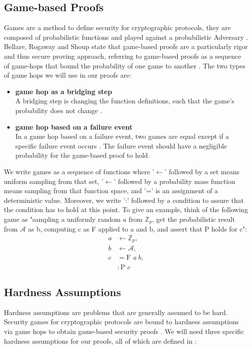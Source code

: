 \subsection{Game-based Proofs}
Games are a method to define security for cryptographic protocols, they are composed of probabilistic functions and played against a probabilistic Adversary \parencite{shoup_games}. Bellare, Rogaway and Shoup state that game-based proofs are a particularly rigor and thus secure proving approach, referring to game-based proofs as a sequence of game-hops that bound the probability of one game to another \parencite{gamesB&R,shoup_games}. The two types of game hops we will use in our proofs are: 
\begin{itemize}
    \item \textbf{game hop as a bridging step} \\
    A bridging step is changing the function definitions, such that the game's probability does not change \parencite{shoup_games}. 
    \item \textbf{game hop based on a failure event} \\
    In a game hop based on a failure event, two games are equal except if a specific failure event occurs \parencite{shoup_games}. The failure event should have a negligible probability for the game-based proof to hold. 
\end{itemize}
We write games as a sequence of functions where '$\leftarrow$' followed by a set means uniform sampling from that set, '$\leftarrow$' followed by a probability mass function means sampling from that function space, and '=' is an assignment of a deterministic value. Moreover, we write ':' followed by a condition to assure that the condition has to hold at this point. 
To give an example, think of the following game as "sampling a uniformly random $a$ from $\mathbb{Z}_p$, get the probabilistic result from $\mathcal{A}$ as b, computing c as F applied to a and b, and assert that P holds for c":
\begin{equation*}
    \begin{split}
        a & \leftarrow \mathbb{Z}_p,\\
        b & \leftarrow \mathcal{A},\\
        c & = \text{F }a \ b,\\
        & : \text{P } c 
    \end{split}
\end{equation*}



\subsection{Hardness Assumptions}
Hardness assumptions are problems that are generally assumed to be hard. Security games for cryptographic protocols are bound to hardness assumptions via game hops to obtain game-based security proofs \parencite{boneh_shoup}.
We will need three specific hardness assumptions for our proofs, all of which are defined in \parencite{KZG}:

